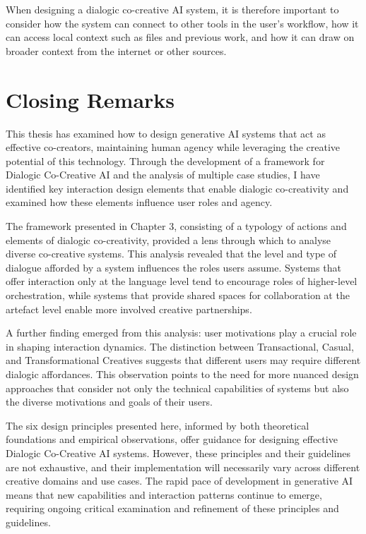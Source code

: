 When designing a dialogic co-creative AI system, it is therefore important to consider how the system can connect to other tools in the user's workflow, how it can access local context such as files and previous work, and how it can draw on broader context from the internet or other sources.


\section{Closing Remarks}

This thesis has examined how to design generative AI systems that act as effective co-creators, maintaining human agency while leveraging the creative potential of this technology. Through the development of a framework for Dialogic Co-Creative AI and the analysis of multiple case studies, I have identified key interaction design elements that enable dialogic co-creativity and examined how these elements influence user roles and agency.

The framework presented in Chapter 3, consisting of a typology of actions and elements of dialogic co-creativity, provided a lens through which to analyse diverse co-creative systems. This analysis revealed that the level and type of dialogue afforded by a system influences the roles users assume. Systems that offer interaction only at the language level tend to encourage roles of higher-level orchestration, while systems that provide shared spaces for collaboration at the artefact level enable more involved creative partnerships.

A further finding emerged from this analysis: user motivations play a crucial role in shaping interaction dynamics. The distinction between Transactional, Casual, and Transformational Creatives suggests that different users may require different dialogic affordances. This observation points to the need for more nuanced design approaches that consider not only the technical capabilities of systems but also the diverse motivations and goals of their users.

The six design principles presented here, informed by both theoretical foundations and empirical observations, offer guidance for designing effective Dialogic Co-Creative AI systems. However, these principles and their guidelines are not exhaustive, and their implementation will necessarily vary across different creative domains and use cases. The rapid pace of development in generative AI means that new capabilities and interaction patterns continue to emerge, requiring ongoing critical examination and refinement of these principles and guidelines.

